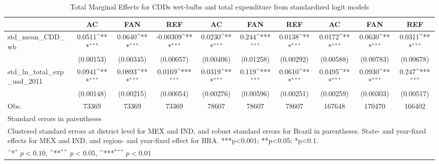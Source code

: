 \begin{table}[htbp]\centering\footnotesize{
\def\sym#1{\ifmmode^{#1}\else\(^{#1}\)\fi}
\caption{Total Marginal Effects for CDDs wet-bulbs and total expenditure from standardized logit models \label{table_1}}
\begin{tabular}{l*{9}{c}}
\hline\hline
            &\multicolumn{1}{c}{AC}&\multicolumn{1}{c}{FAN}&\multicolumn{1}{c}{REF}&\multicolumn{1}{c}{AC}&\multicolumn{1}{c}{FAN}&\multicolumn{1}{c}{REF}&\multicolumn{1}{c}{AC}&\multicolumn{1}{c}{FAN}&\multicolumn{1}{c}{REF}\\
\hline
std_mean_CDD_wb&      0.0511\sym{***}&      0.0640\sym{***}&    -0.00309\sym{***}&      0.0230\sym{***}&       0.244\sym{***}&      0.0138\sym{***}&      0.0172\sym{***}&      0.0630\sym{***}&      0.0311\sym{***}\\
            &   (0.00153)         &   (0.00345)         &   (0.00057)         &   (0.00406)         &   (0.01258)         &   (0.00292)         &   (0.00588)         &   (0.00783)         &   (0.00678)         \\
std_ln_total_exp_usd_2011&      0.0941\sym{***}&      0.0893\sym{***}&      0.0169\sym{***}&      0.0319\sym{***}&       0.119\sym{***}&      0.0610\sym{***}&      0.0495\sym{***}&      0.0930\sym{***}&       0.247\sym{***}\\
            &   (0.00148)         &   (0.00215)         &   (0.00054)         &   (0.00276)         &   (0.00596)         &   (0.00251)         &   (0.00259)         &   (0.00303)         &   (0.00517)         \\
\hline
Obs.        &       73369         &       73369         &       73369         &       78607         &       78607         &       78607         &      167648         &      170470         &      166402         \\
\hline\hline
\multicolumn{10}{l}{\footnotesize Standard errors in parentheses}\\
\multicolumn{10}{l}{\footnotesize Clustered standard errors at district level for MEX and IND, and robust standard errors for Brazil in parentheses. State- and year-fixed effects for MEX and IND, and region- and year-fixed effect for BRA. ***p<0.001; **p<0.05; *p<0.1.}\\
\multicolumn{10}{l}{\footnotesize \sym{*} \(p<0.10\), \sym{**} \(p<0.05\), \sym{***} \(p<0.01\)}\\
\end{tabular}}
\end{table}
